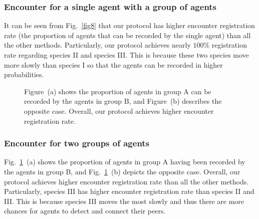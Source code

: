 \subsubsection{Encounter for a single 
agent with a group of agents}

It can be seen from Fig.~\ref{fig8} that 
our protocol has higher encounter
registration rate (the proportion of agents that can 
be recorded by the single agent) than all the other methods.
Particularly, our protocol achieves nearly $100\%$ registration
rate regarding species II and species III.
This is because these two species move more slowly than species I 
so that the agents can be recorded in higher probabilities. 

\begin{figure}[!h]
    \centering
    \hspace{0.01in}
    \caption{Figure~(a) shows the proportion of agents in group A can 
    be recorded by the agents in group B, and Figure~(b) describes
    the opposite case. Overall, our protocol
    achieves higher encounter registration rate.}
    \label{fig9}
\end{figure}

\subsubsection{Encounter for two groups of agents}

Fig.~\ref{fig9}~(a) shows the proportion of agents in group A having 
been recorded by the agents in group B, and Fig.~\ref{fig9}~(b) depicts
the opposite case. Overall, our protocol achieves higher encounter 
registration rate than all the other methods. Particularly, species III
has higher encounter registration rate than species II and III.
This is because species III moves the most slowly and thus there are more 
chances for agents to detect and connect their peers. 

